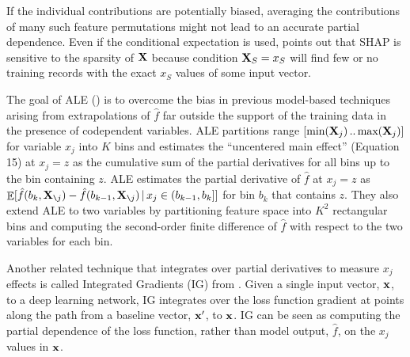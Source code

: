 \documentclass[smallextended]{svjour3}       %
\renewcommand{\slash}{\texttt{\char`\\}}
\DeclareMathOperator{\Ex}{\mathbb{E}}
\begin{document}
If the individual contributions are potentially biased, averaging the contributions of many such feature permutations might not lead to an accurate partial dependence.  Even if the conditional expectation is used, \cite{manyshap} points out that SHAP is sensitive to the sparsity of $\bf X$ because condition ${\bf X}_S = x_S$ will find few or no training records with the exact $x_S$ values of some input vector.


The goal of ALE (\cite{ALE}) is to overcome the bias in previous model-based techniques arising from extrapolations of $\hat{f}$ far outside the support of the training data in the presence of codependent variables.   ALE  partitions range $[\text{min}({\bf X}_j) \,..\, \text{max}({\bf X}_j)]$ for variable $x_j$ into $K$ bins and estimates the ``uncentered main effect'' (Equation 15) at $x_j = z$ as the cumulative sum of the partial derivatives for all bins up to the bin containing $z$. ALE estimates the partial derivative of $\hat{f}$ at $x_j=z$ as $\Ex[\hat{f}(b_k, {\bf X}_{\slash j}) - \hat{f}(b_{k-1}, {\bf X}_{\slash j}) \, | \, x_j \in (b_{k-1},b_k]]$ for bin $b_k$ that contains $z$. They also extend ALE to two variables by partitioning feature space into $K^2$ rectangular bins and computing the  second-order finite difference of $\hat{f}$ with respect to the two variables for each bin. 

Another related technique that integrates over partial derivatives to measure $x_j$ effects is called Integrated Gradients (IG) from \cite{intgrad}. Given a single input vector, $\bf x$, to a deep learning network, IG integrates over the loss function gradient at points along the path from a baseline vector, $\bf x'$, to $\bf x$. IG can be seen as computing the partial dependence of the loss function, rather than model output, $\hat{f}$, on the $x_j$ values in ${\bf x}$.
\end{document}
